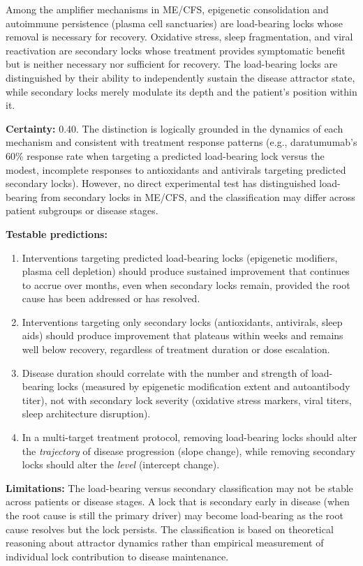 \begin{hypothesis}
\label{hyp:load-bearing}
Among the amplifier mechanisms in ME/CFS, epigenetic consolidation and autoimmune persistence (plasma cell sanctuaries) are load-bearing locks whose removal is necessary for recovery. Oxidative stress, sleep fragmentation, and viral reactivation are secondary locks whose treatment provides symptomatic benefit but is neither necessary nor sufficient for recovery. The load-bearing locks are distinguished by their ability to independently sustain the disease attractor state, while secondary locks merely modulate its depth and the patient's position within it.

\textbf{Certainty:} 0.40. The distinction is logically grounded in the dynamics of each mechanism and consistent with treatment response patterns (e.g., daratumumab's 60\% response rate when targeting a predicted load-bearing lock versus the modest, incomplete responses to antioxidants and antivirals targeting predicted secondary locks). However, no direct experimental test has distinguished load-bearing from secondary locks in ME/CFS, and the classification may differ across patient subgroups or disease stages.

\textbf{Testable predictions:}
\begin{enumerate}
    \item Interventions targeting predicted load-bearing locks (epigenetic modifiers, plasma cell depletion) should produce sustained improvement that continues to accrue over months, even when secondary locks remain, provided the root cause has been addressed or has resolved.
    \item Interventions targeting only secondary locks (antioxidants, antivirals, sleep aids) should produce improvement that plateaus within weeks and remains well below recovery, regardless of treatment duration or dose escalation.
    \item Disease duration should correlate with the number and strength of load-bearing locks (measured by epigenetic modification extent and autoantibody titer), not with secondary lock severity (oxidative stress markers, viral titers, sleep architecture disruption).
    \item In a multi-target treatment protocol, removing load-bearing locks should alter the \emph{trajectory} of disease progression (slope change), while removing secondary locks should alter the \emph{level} (intercept change).
\end{enumerate}

\textbf{Limitations:} The load-bearing versus secondary classification may not be stable across patients or disease stages. A lock that is secondary early in disease (when the root cause is still the primary driver) may become load-bearing as the root cause resolves but the lock persists. The classification is based on theoretical reasoning about attractor dynamics rather than empirical measurement of individual lock contribution to disease maintenance.
\end{hypothesis}

